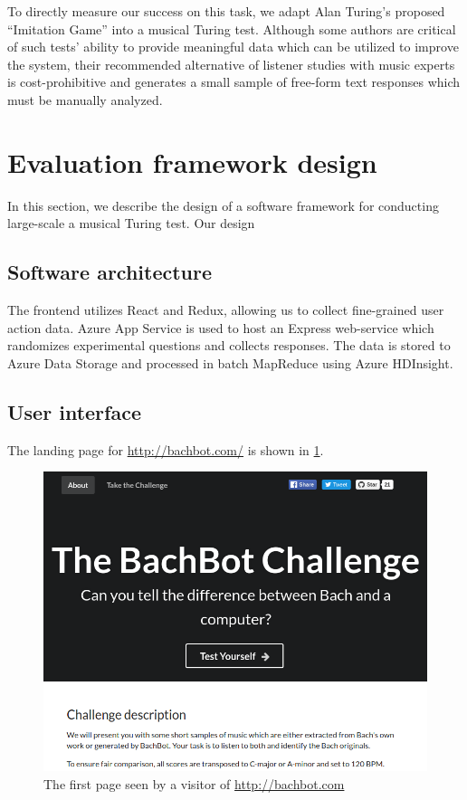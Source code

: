 To directly measure our success on this task, we adapt Alan Turing's proposed
``Imitation Game'' \citep{turing1950computing} into a musical Turing test.
Although some authors \citep{ariza2009interrogator} are critical of such tests'
ability to provide meaningful data which can be utilized to improve the system,
their recommended alternative of listener studies with music experts is
cost-prohibitive and generates a small sample of free-form text responses which
must be manually analyzed.

\section{Evaluation framework design}

In this section, we describe the design of a software framework for conducting
large-scale a musical Turing test. Our design 
\subsection{Software architecture}

The frontend utilizes React and Redux, allowing us to collect fine-grained user
action data. Azure App Service is used to host an Express web-service which
randomizes experimental questions and collects responses. The data is stored to
Azure Data Storage and processed in batch MapReduce using Azure HDInsight.

\subsection{User interface}

The landing page for \url{http://bachbot.com/} is shown in \cref{fig:bachbot-front-page}.

\begin{figure}[tb]
  \centering
  \includegraphics[width=1.0\linewidth]{bachbot-front-page.png}
  \caption{The first page seen by a visitor of \url{http://bachbot.com}}
  \label{fig:bachbot-front-page}
\end{figure}

